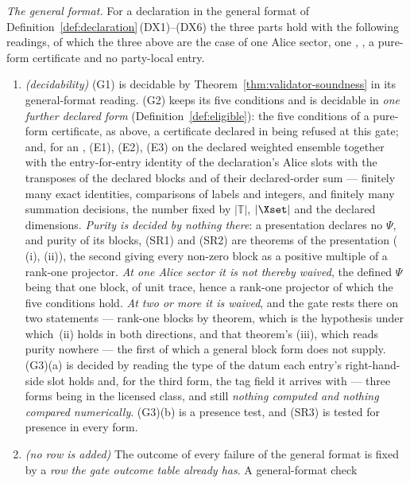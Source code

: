 \begin{theorem}
\emph{The general format.} For a declaration in the general format of
Definition~\ref{def:declaration}\,(DX1)--(DX6) the three parts hold with the
following readings, of which the three above are the case of one Alice sector,
one , , a pure-form certificate and no
party-local entry.
\begin{enumerate}[label=(\roman*$'$),leftmargin=2.6em]
\item \emph{(decidability)} (G1) is decidable by Theorem~\ref{thm:validator-soundness} in its
general-format reading. (G2) keeps its five conditions and is decidable in
\emph{one further declared form} (Definition~\ref{def:eligible}): the five
conditions of a pure-form certificate, as above, a certificate declared
in  being refused at this gate; and, for an , (E1), (E2), (E3) on the declared weighted ensemble together with
the entry-for-entry identity of the declaration's Alice slots with the
transposes of the declared blocks and of their declared-order sum --- finitely
many exact identities, comparisons of labels and integers, and finitely many
summation decisions, the number fixed by $|\mathbb{T}|$, $|\Xset|$ and the
declared dimensions. \emph{Purity is decided by nothing there}: a presentation
declares no $\Psi$, and purity of its blocks, (SR1) and (SR2) are theorems of
the presentation (\,(i), (ii)), the
second giving every non-zero block as a positive multiple of a rank-one
projector. \emph{At one Alice sector it is not thereby waived}, the defined
$\Psi$ being that one block, of unit trace, hence a rank-one projector of which
the five conditions hold. \emph{At two or more it is waived}, and the gate
rests there on two statements --- rank-one blocks by theorem, which is the
hypothesis under which \,(ii) holds in both directions,
and that theorem's (iii), which reads purity nowhere --- the first of which a
general block form does not supply. (G3)(a) is decided by reading the type of the
datum each entry's right-hand-side slot holds and, for the third form, the tag
field it arrives with --- three forms being in the licensed class, and still
\emph{nothing computed and nothing compared numerically}. (G3)(b) is a presence
test, and (SR3) is tested for presence in every form.
\item \emph{(no row is added)} The outcome of every failure of the general
format is fixed by a \emph{row the gate outcome table already has}. A
general-format check

\end{enumerate}
\end{theorem}
